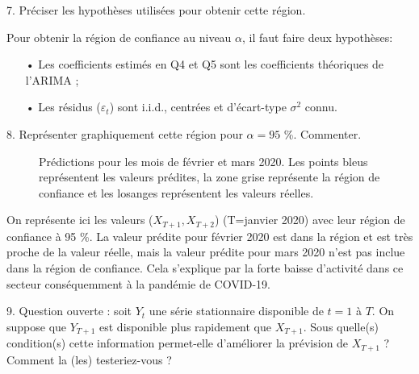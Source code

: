 \documentclass[a4paper, 12pt]{article} %
\begin{document}
\begin{tcolorbox}
{\small
7. Préciser les hypothèses utilisées pour obtenir cette région.
}
\end{tcolorbox}
\normalsize{
{Pour obtenir la région de confiance au niveau $\alpha$, il faut faire deux hypothèses:
\begin{itemize}
\item[•] Les coefficients estimés en Q4 et Q5 sont les coefficients théoriques de l'ARIMA ;
\item[•] Les résidus ($\varepsilon_t$) sont i.i.d., centrées et d'écart-type $\sigma^2$ connu.
\end{itemize}}}
\begin{tcolorbox}
{\small
8. Représenter graphiquement cette région pour $\alpha = 95$ \%. Commenter.
}
\end{tcolorbox}
\begin{figure}[h]
    \centering
    \caption{Prédictions pour les mois de février et mars 2020. Les points bleus représentent les valeurs prédites, la zone grise représente la région de confiance et les losanges représentent les valeurs réelles.}
\end{figure}
\normalsize{
{On représente ici les valeurs ($X_{T+1}, X_{T+2}$) (T=janvier 2020) avec leur région de confiance à 95 \%. La valeur prédite pour février 2020 est dans la région et est très proche de la valeur réelle, mais la valeur prédite pour mars 2020 n'est pas inclue dans la région de confiance. Cela s'explique par la forte baisse d'activité dans ce secteur conséquemment à la pandémie de COVID-19.\\
}}
\begin{tcolorbox}
{\small
9. Question ouverte : soit $Y_t$ une série stationnaire disponible de $t = 1$ à $T$. On suppose que $Y_{T+1}$
est disponible plus rapidement que $X_{T+1}$. Sous quelle(s) condition(s) cette information permet-elle
d’améliorer la prévision de $X_{T+1}$ ? Comment la (les) testeriez-vous ?
}
\end{tcolorbox}
\end{document}
